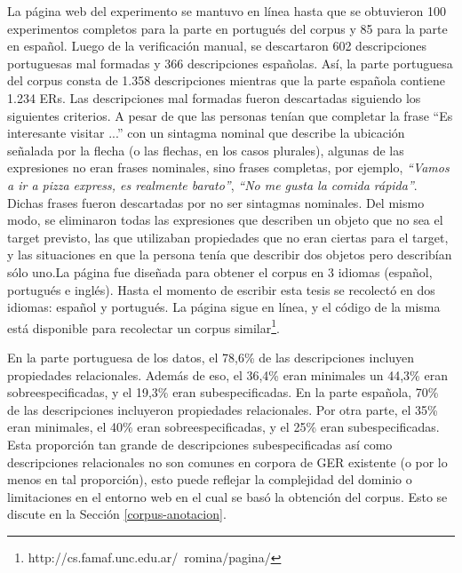La p\'agina web del experimento se mantuvo en l\'{i}nea hasta que se obtuvieron 100 experimentos completos para la parte en portugu\'es del corpus y 85  para la parte en espa\~nol. Luego de la verificaci\'on manual, se descartaron 602 descripciones portuguesas mal formadas y 366 descripciones espa\~nolas. As\'{i}, la parte portuguesa del corpus consta de 1.358 descripciones mientras que la parte espa\~nola contiene 1.234 ERs. 
Las descripciones mal formadas fueron descartadas siguiendo los siguientes criterios. A pesar de que las personas ten\'{i}an que completar la frase ``Es interesante visitar ...'' con un sintagma nominal que describe la ubicaci\'on se\~nalada por la flecha (o las flechas, en los casos plurales), algunas de las expresiones no eran frases nominales, sino frases completas, por ejemplo, \emph{``Vamos a ir a pizza express, es realmente barato''}, \emph{``No me gusta la comida r\'apida''}. Dichas frases fueron descartadas por no ser sintagmas nominales. Del mismo modo, se eliminaron todas las expresiones que describen un objeto que no sea el target previsto, las que utilizaban propiedades que no eran ciertas para el target, y las situaciones en que la persona ten\'{i}a que describir dos objetos pero describ\'ian s\'olo uno.La p\'agina fue dise\~nada para obtener el corpus en 3 idiomas (espa\~nol, portugu\'es e ingl\'es). Hasta el momento de escribir esta tesis se recolect\'o en dos idiomas: espa\~nol y portugu\'es. La p\'agina sigue en l\'inea, y el c\'odigo de la misma est\'a disponible para recolectar un corpus similar\footnote{http://cs.famaf.unc.edu.ar/~romina/pagina/}.

En la parte portuguesa de los datos, el 78,6\% de las descripciones incluyen propiedades relacionales. Adem\'as de eso, el 36,4\% eran minimales un 44,3\% eran sobreespecificadas, y el 19,3\% eran subespecificadas. En la parte espa\~nola, 70\% de las descripciones incluyeron propiedades relacionales. Por otra parte, el 35\% eran minimales, el 40\% eran sobreespecificadas, y el 25\% eran subespecificadas.
Esta proporci\'on tan grande de descripciones subespecificadas as\'{i} como descripciones relacionales no son comunes en corpora de GER existente (o por lo menos en tal proporci\'on), esto puede reflejar la complejidad del dominio o limitaciones en el entorno web en el cual se bas\'o la obtenci\'on del corpus. Esto se discute en la Secci\'on \ref{corpus-anotacion}.




